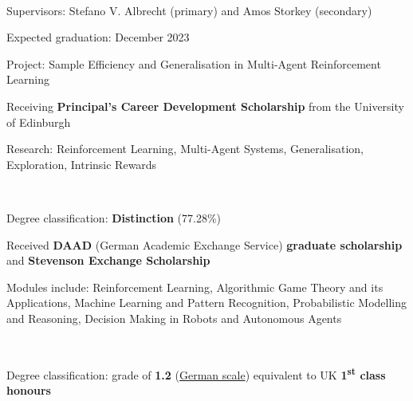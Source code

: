 \documentclass[]{lukas-cv-openfont}
\begin{document}

\noindent
{}
\\
\begin{tightitemize}{1.7em}
    \item Supervisors: Stefano V. Albrecht (primary) and Amos Storkey (secondary)
    \item Expected graduation: December 2023
    \item Project: Sample Efficiency and Generalisation in Multi-Agent Reinforcement Learning
    \item Receiving \textbf{Principal's Career Development Scholarship} from the University of Edinburgh
    \item Research: Reinforcement Learning, Multi-Agent Systems, Generalisation, Exploration, Intrinsic Rewards
\end{tightitemize}
\largesectionsep

\noindent
{}
\\
\begin{tightitemize}{1.7em}
    \item Degree classification: \textbf{Distinction} (77.28\%)
    \item Received \textbf{DAAD} (German Academic Exchange Service) \textbf{graduate scholarship} and \textbf{Stevenson Exchange Scholarship} 
    \item Modules include: Reinforcement Learning, Algorithmic Game Theory and its Applications, Machine Learning and 
    Pattern Recognition, Probabilistic Modelling and Reasoning, Decision Making in Robots and Autonomous Agents
\end{tightitemize}
\largesectionsep

\noindent
{}
\\
\begin{tightitemize}{1.7em}
    \item Degree classification: grade of \textbf{1.2} (\href{https://en.wikipedia.org/wiki/Academic_grading_in_Germany}{German scale}) equivalent to UK \textbf{1\textsuperscript{st} class honours}
\end{tightitemize}
\largesectionsep
\end{document}
